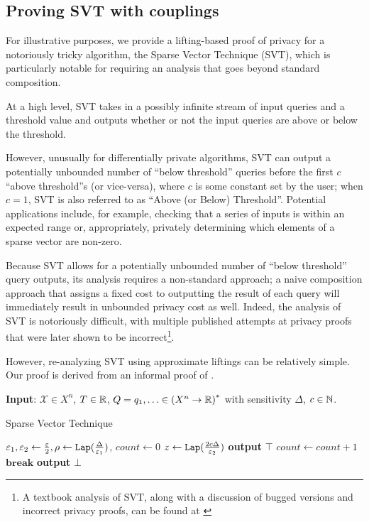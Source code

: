 \subsection{Proving SVT with couplings}

For illustrative purposes, we provide a lifting-based proof of privacy for a notoriously tricky algorithm, the Sparse Vector Technique (SVT), which is particularly notable for requiring an analysis that goes beyond standard composition.

At a high level, SVT takes in a possibly infinite stream of input queries and a threshold value and outputs whether or not the input queries are above or below the threshold.

However, unusually for differentially private algorithms, SVT can output a potentially unbounded number of ``below threshold'' queries before the first $c$ ``above threshold''s (or vice-versa), where $c$ is some constant set by the user; when $c=1$, SVT is also referred to as ``Above (or Below) Threshold''. Potential applications include, for example, checking that a series of inputs is within an expected range or, appropriately, privately determining which elements of a sparse vector are non-zero. 

Because SVT allows for a potentially unbounded number of ``below threshold'' query outputs, its analysis requires a non-standard approach; a naive composition approach that assigns a fixed cost to outputting the result of each query will immediately result in unbounded privacy cost as well. 
Indeed, the analysis of SVT is notoriously difficult, with multiple published attempts at privacy proofs that were later shown to be incorrect\footnote{A textbook analysis of SVT, along with a discussion of bugged versions and incorrect privacy proofs, can be found at \cite{lyuUnderstandingSparseVector2016a}}. 

However, re-analyzing SVT using approximate liftings can be relatively simple. Our proof is derived from an informal proof of \cite{bartheProvingDifferentialPrivacy2016}.

\begin{algorithm}
    \hspace*{\algorithmicindent}\textbf{Input}: $\mathcal{X}\in X^n$, $T\in \mathbb{R}$, $Q=q_1, \ldots \in {(X^n\to \mathbb{R})}^*$ with sensitivity $\Delta$, $c\in \mathbb{N}$.
    \begin{algorithmic}[1]
        \caption{Sparse Vector Technique}\label{couplingAlg}
        \State $\varepsilon_1, \varepsilon_2 \gets \frac{\varepsilon}{2},
        \rho \gets \texttt{Lap}(\frac{\Delta}{\varepsilon_1})$, $count \gets 0$
			\State $z\gets \texttt{Lap}(\frac{2c\Delta}{\varepsilon_2})$
                \State\textbf{output} $\top$
                \State$count\gets count+1$
                    \State$\textbf{break}$
                \EndIf
            \Else
                \State\textbf{output} $\bot$
            \EndIf
		\EndFor
    \end{algorithmic}
\end{algorithm}


